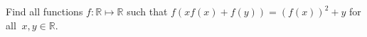 Find all functions $f : \mathbb{R} \mapsto \mathbb{R}$ such that $f(xf(x)+f(y)) =(f(x))^2+y$ for all $\ x,y \in \mathbb{R}.$